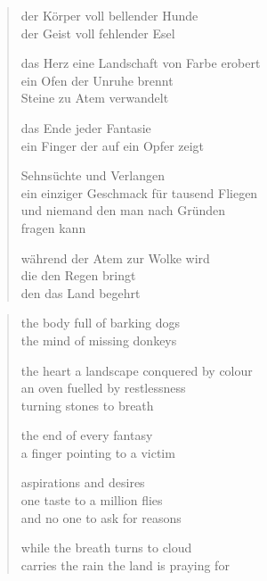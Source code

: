 
\cleartoverso


\begin{verse}

der Körper voll bellender Hunde\\
der Geist voll fehlender Esel

das Herz eine Landschaft von Farbe erobert\\
ein Ofen der Unruhe brennt\\
Steine zu Atem verwandelt

das Ende jeder Fantasie\\
ein Finger der auf ein Opfer zeigt

Sehnsüchte und Verlangen\\
ein einziger Geschmack für tausend Fliegen\\
und niemand den man nach Gründen\\
fragen kann

während der Atem zur Wolke wird\\
die den Regen bringt\\
den das Land begehrt

\end{verse}

\clearpage


\begin{verse}

the body full of barking dogs\\
the mind of missing donkeys

the heart a landscape conquered by colour\\
an oven fuelled by restlessness\\
turning stones to breath

the end of every fantasy\\
a finger pointing to a victim

aspirations and desires\\
one taste to a million flies\\
and no one to ask for reasons

while the breath turns to cloud\\
carries the rain the land is praying for

\end{verse}

